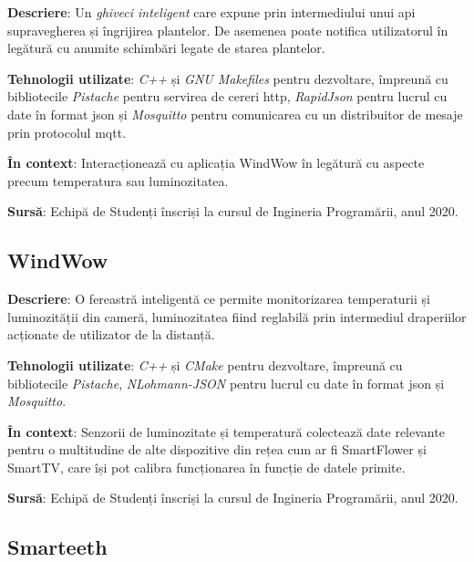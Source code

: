 \textbf{Descriere}:  Un \textit{ghiveci inteligent} care expune prin intermediului unui \acrshort{api} supravegherea și îngrijirea plantelor. De asemenea poate notifica utilizatorul în legătură cu anumite schimbări legate de starea plantelor.

\textbf{Tehnologii utilizate}: \textit{C++} și \textit{GNU Makefiles} pentru dezvoltare, împreună cu bibliotecile \textit{Pistache} pentru servirea de cereri \acrfull{http}, \textit{RapidJson} pentru lucrul cu date în format \acrfull{json} și \textit{Mosquitto} pentru comunicarea cu un distribuitor de mesaje prin protocolul \acrfull{mqtt}. 

\textbf{În context}: Interacționează cu aplicația WindWow în legătură cu aspecte precum temperatura sau luminozitatea.

\textbf{Sursă}: Echipă de Studenți înscriși la cursul de Ingineria Programării, anul 2020.

\subsection*{WindWow}

\textbf{Descriere}:  O fereastră inteligentă ce permite monitorizarea temperaturii și luminozității din cameră, luminozitatea fiind reglabilă prin intermediul draperiilor acționate de utilizator de la distanță.

\textbf{Tehnologii utilizate}: \textit{C++} și \textit{CMake} pentru dezvoltare, împreună cu bibliotecile \textit{Pistache}, \textit{NLohmann-JSON} pentru lucrul cu date în format \acrshort{json} și \textit{Mosquitto}.

\textbf{În context}: Senzorii de luminozitate și temperatură colectează date relevante pentru o multitudine de alte dispozitive din rețea cum ar fi SmartFlower și SmartTV, care își pot calibra funcționarea în funcție de datele primite.

\textbf{Sursă}: Echipă de Studenți înscriși la cursul de Ingineria Programării, anul 2020.

\subsection*{Smarteeth}

